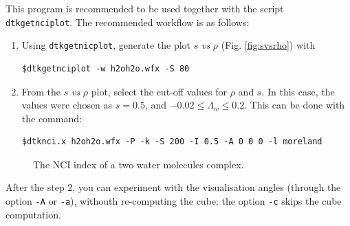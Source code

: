 This program is recommended to be used together with the script \texttt{dtkgetnciplot}. The recommended workflow is as follows:
\begin{enumerate}
	\item Using \texttt{dtkgetnicplot}, generate the plot $s$ \textit{vs} $\rho$ (Fig. \ref{fig:svsrho}) with
	\begin{lstlisting}
$dtkgetnciplot -w h2oh2o.wfx -S 80
	\end{lstlisting}
	\item From the $s$ \textit{vs} $\rho$ plot, select the cut-off values for $\rho$ and $s$. In this case,
	the values were chosen as $s=0.5$, and  $-0.02\leq\Lambda_w\leq0.2$. This can be done with the command:
	\begin{lstlisting}
$dtknci.x h2oh2o.wfx -P -k -S 200 -I 0.5 -A 0 0 0 -l moreland
	\end{lstlisting}
\end{enumerate}
%
\begin{figure}[hb!]
\centering
{}\quad
{}
\caption{The NCI index of a two water molecules complex.}\label{fig:dtknci}
\end{figure}
%

After the step 2, you can experiment with the visualisation angles (through the option \texttt{-A}
or \texttt{-a}), withouth re-computing the cube: the option \texttt{-c} skips the cube computation.


